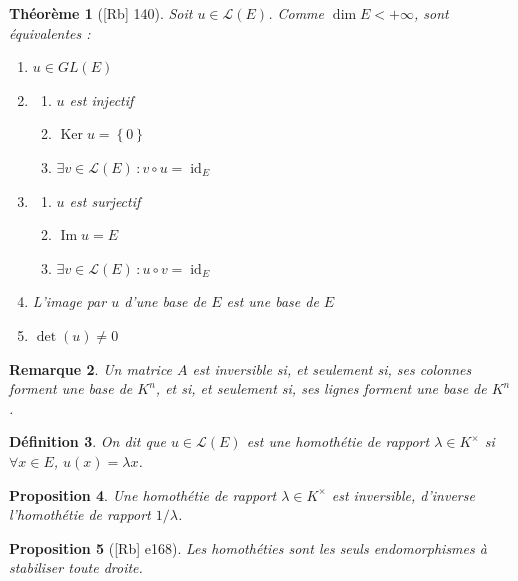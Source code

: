 \documentclass[10pt, a4paper, parskip=full, twoside, twocolumn]{report}
\newtheorem{definition}{Définition}
\newtheorem{theorem}[definition]{Théorème}
\newtheorem{proposition}[definition]{Proposition}
\newtheorem{remark}[definition]{Remarque}
\DeclareMathOperator{\im}{Im}
\DeclareMathOperator{\Ker}{Ker}
\DeclareMathOperator{\id}{id}
\begin{document}
\begin{theorem}[\textnormal{[Rb] 140}]
	Soit $u\in\mathcal{L}(E)$. Comme $\dim E < +\infty$, sont équivalentes :
	\begin{enumerate}
		\item $u\in GL(E)$
		\item {\begin{enumerate}
			\item $u$ est injectif
			\item $\Ker u = \left\{0\right\}$
			\item $\exists v\in \mathcal{L}(E)\,\colon v\circ u = \id_E$
		\end{enumerate}}
		\item {\begin{enumerate}
			\item $u$ est surjectif
			\item $\im u = E$
			\item $\exists v\in \mathcal{L}(E)\,\colon u\circ v = \id_E$
		\end{enumerate}}
		\item L'image par $u$ d'une base de $E$ est une base de $E$
		\item $\det(u) \neq 0$
	\end{enumerate}
\end{theorem}

\begin{remark}
	Un matrice $A$ est inversible si, et seulement si, ses colonnes forment une base de $K^n$, et si, et seulement si, ses lignes forment une base de $K^n$.
\end{remark}

\begin{definition}
	On dit que $u\in\mathcal{L}(E)$ est une \emph{homothétie de rapport $\lambda\in K^{\times}$} si $\forall x\in E$, $u(x) = \lambda x$.
\end{definition}

\begin{proposition}
	Une homothétie de rapport $\lambda\in K^{\times}$ est inversible, d'inverse l'homothétie de rapport $1/\lambda$.
\end{proposition}

\begin{proposition}[\textnormal{[Rb] e168}]
	Les homothéties sont les seuls endomorphismes à stabiliser toute droite.
\end{proposition}
\end{document}
